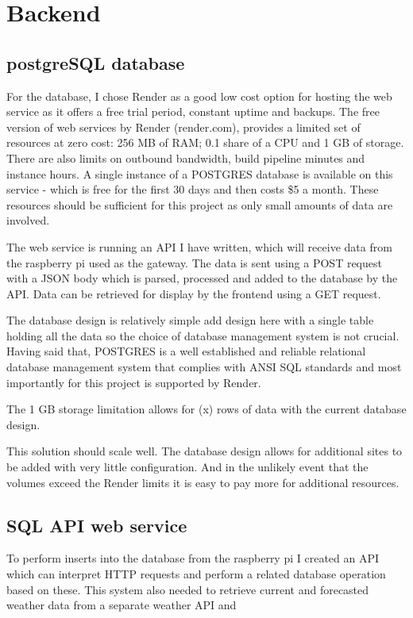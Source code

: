 \section{Backend}

\subsection{postgreSQL database}

For the database, I chose Render as a good low cost option for hosting the web
service as it offers a free trial period, constant uptime and backups. The free
version of web services by Render (render.com), provides a limited set of
resources at zero cost: 256 MB of RAM; 0.1 share of a CPU and 1 GB of storage.
There are also limits on outbound bandwidth, build pipeline minutes and instance
hours. A single instance of a POSTGRES database is available on this service -
which is free for the first 30 days and then costs \$5 a month. These resources
should be sufficient for this project as only small amounts of data are
involved.

The web service is running an API I have written, which will receive data from
the raspberry pi used as the gateway. The data is sent using a POST request with
a JSON body which is parsed, processed and added to the database by the API.
Data can be retrieved for display by the frontend using a GET request.

The database design is relatively simple  add design here with a single table
holding all the data so the choice of database management system is not crucial.
Having said that, POSTGRES is a well established and reliable relational
database management system that complies with ANSI SQL standards and most
importantly for this project is supported by Render.

The 1 GB storage limitation allows for (x) rows of data with the current
database design.

This solution should scale well. The database design allows for additional sites
to be added with very little configuration. And in the unlikely event that the
volumes exceed the Render limits it is easy to pay more for additional
resources.

\subsection{SQL API web service}

To perform inserts into the database from the raspberry pi I created an API
which can interpret HTTP requests and perform a related database operation based
on these. This system also needed to retrieve current and forecasted weather
data from a separate weather API and


